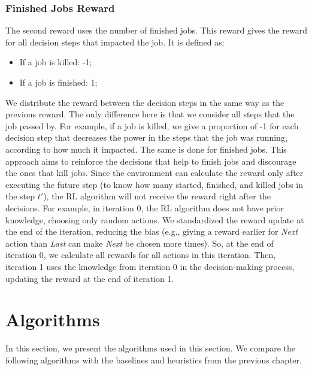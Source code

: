 \subsubsection{Finished Jobs Reward}

The second reward uses the number of finished jobs. This reward gives the reward for all decision steps that impacted the job. It is defined as:
\begin{itemize}
    \item If a job is killed: -1;
    \item If a job is finished: 1;
\end{itemize}

We distribute the reward between the decision steps in the same way as the previous reward. The only difference here is that we consider all steps that the job passed by. For example, if a job is killed, we give a proportion of -1 for each decision step that decreases the power in the steps that the job was running, according to how much it impacted. The same is done for finished jobs. This approach aims to reinforce the decisions that help to finish jobs and discourage the ones that kill jobs. 
Since the environment can calculate the reward only after executing the future step (to know how many started, finished, and killed jobs in the step $t'$), the RL algorithm will not receive the reward right after the decisions. For example, in iteration 0, the RL algorithm does not have prior knowledge, choosing only random actions. We standardized the reward update at the end of the iteration, reducing the bias (e.g., giving a reward earlier for \emph{Next} action than \emph{Last} can make \emph{Next} be chosen more times). So, at the end of iteration 0, we calculate all rewards for all actions in this iteration. Then, iteration 1 uses the knowledge from iteration 0 in the decision-making process, updating the reward at the end of iteration 1.

\section{Algorithms}
\label{sec:RL_algos}
In this section, we present the algorithms used in this section. We compare the following algorithms with the baselines and heuristics from the previous chapter.

